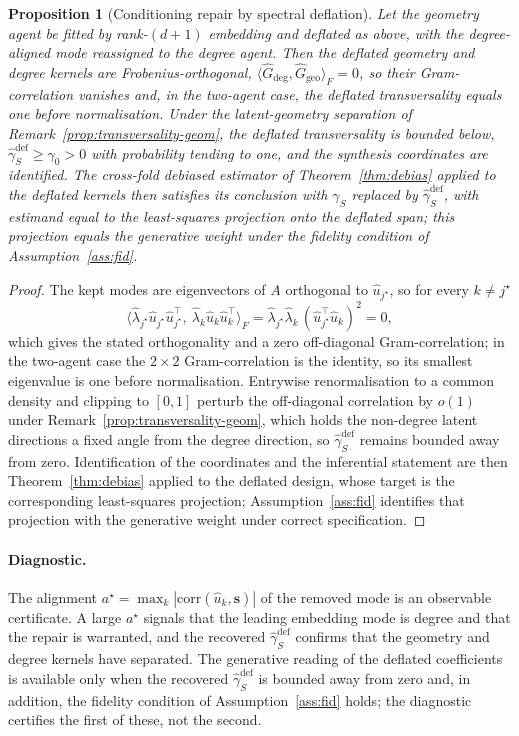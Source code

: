 \documentclass[12pt]{article}
\newtheorem{proposition}{Proposition}
\newcommand{\1}{\mathbf{1}}
\begin{document}
\begin{proposition}[Conditioning repair by spectral deflation]
\label{prop:deflation}
Let the geometry agent be fitted by rank-$(d{+}1)$ embedding and deflated as above, with the degree-aligned mode reassigned to the degree agent. Then the deflated geometry and degree kernels are Frobenius-orthogonal, $\langle\widehat G_{\deg},\widehat G_{\mathrm{geo}}\rangle_F=0$, so their Gram-correlation vanishes and, in the two-agent case, the deflated transversality equals one before normalisation. Under the latent-geometry separation of Remark~\ref{prop:transversality-geom}, the deflated transversality is bounded below, $\widehat\gamma_S^{\mathrm{def}}\ge\gamma_0>0$ with probability tending to one, and the synthesis coordinates are identified. The cross-fold debiased estimator of Theorem~\ref{thm:debias} applied to the deflated kernels then satisfies its conclusion with $\gamma_S$ replaced by $\widehat\gamma_S^{\mathrm{def}}$, with estimand equal to the least-squares projection onto the deflated span; this projection equals the generative weight under the fidelity condition of Assumption~\ref{ass:fid}.
\end{proposition}
\begin{proof}
The kept modes are eigenvectors of $A$ orthogonal to $\widehat u_{j^\star}$, so for every $k\ne j^\star$
\[
\bigl\langle \widehat\lambda_{j^\star}\widehat u_{j^\star}\widehat u_{j^\star}^\top,\ \widehat\lambda_k\widehat u_k\widehat u_k^\top\bigr\rangle_F=\widehat\lambda_{j^\star}\widehat\lambda_k\,(\widehat u_{j^\star}^\top\widehat u_k)^2=0,
\]
which gives the stated orthogonality and a zero off-diagonal Gram-correlation; in the two-agent case the $2\times2$ Gram-correlation is the identity, so its smallest eigenvalue is one before normalisation. Entrywise renormalisation to a common density and clipping to $[0,1]$ perturb the off-diagonal correlation by $o(1)$ under Remark~\ref{prop:transversality-geom}, which holds the non-degree latent directions a fixed angle from the degree direction, so $\widehat\gamma_S^{\mathrm{def}}$ remains bounded away from zero. Identification of the coordinates and the inferential statement are then Theorem~\ref{thm:debias} applied to the deflated design, whose target is the corresponding least-squares projection; Assumption~\ref{ass:fid} identifies that projection with the generative weight under correct specification.
\end{proof}

\paragraph{Diagnostic.} The alignment $a^\star=\max_k|\mathrm{corr}(\widehat u_k,\mathbf s)|$ of the removed mode is an observable certificate. A large $a^\star$ signals that the leading embedding mode is degree and that the repair is warranted, and the recovered $\widehat\gamma_S^{\mathrm{def}}$ confirms that the geometry and degree kernels have separated. The generative reading of the deflated coefficients is available only when the recovered $\widehat\gamma_S^{\mathrm{def}}$ is bounded away from zero and, in addition, the fidelity condition of Assumption~\ref{ass:fid} holds; the diagnostic certifies the first of these, not the second.
\end{document}
